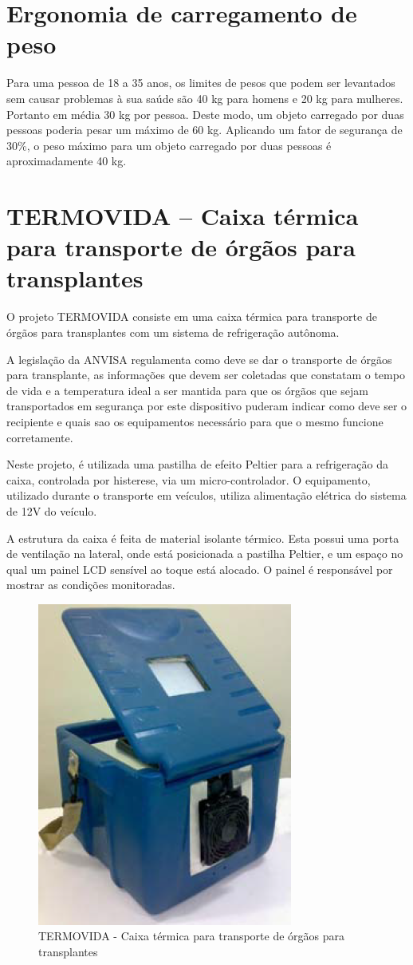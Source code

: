 \section{Ergonomia de carregamento de peso}

Para uma pessoa de 18 a 35 anos, os limites de pesos que podem ser levantados sem causar problemas à sua saúde são 40 kg para homens e 20 kg para mulheres. Portanto em média 30 kg por pessoa. Deste modo, um objeto carregado por duas pessoas poderia pesar um máximo de 60 kg. Aplicando um fator de segurança de 30\%, o peso máximo para um objeto carregado por duas pessoas é aproximadamente 40 kg.

\section{TERMOVIDA – Caixa térmica para transporte de órgãos para transplantes}

O projeto TERMOVIDA consiste em uma caixa térmica para transporte de órgãos para transplantes com um sistema de refrigeração autônoma.

A legislação da ANVISA regulamenta como deve se dar o transporte de órgãos para transplante, as informações que devem ser coletadas que constatam o tempo de vida e a temperatura ideal a ser mantida para que os órgãos que sejam transportados em segurança por este dispositivo puderam indicar como deve ser o recipiente e quais sao os equipamentos necessário para que o mesmo funcione corretamente.

Neste projeto, é utilizada uma pastilha de efeito Peltier para a refrigeração da caixa, controlada por histerese, via um micro-controlador. O equipamento, utilizado durante o transporte em veículos, utiliza alimentação elétrica do sistema de 12V do veículo.

A estrutura da caixa é feita de material isolante térmico. Esta possui uma porta de ventilação na lateral, onde está posicionada a pastilha Peltier, e um espaço no qual um painel LCD sensível ao toque está alocado. O painel é responsável por mostrar as condições monitoradas.

\begin{figure}[H]
\centering
\includegraphics[scale=1]{figuras/termovida.png}
\caption{TERMOVIDA - Caixa térmica para transporte de órgãos para transplantes}
\end{figure}